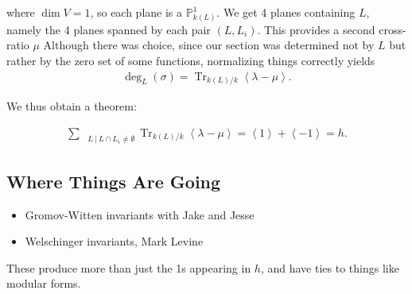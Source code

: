 \begin{example}[?]
where \(\dim V = 1\), so each plane is a \({\mathbb{P}}^1_{k(L)}\). We
get 4 planes containing \(L\), namely the 4 planes spanned by each pair
\((L, L_i)\). This provides a second cross-ratio \(\mu\) Although there
was choice, since our section was determined not by \(L\) but rather by
the zero set of some functions, normalizing things correctly yields
\begin{align*}
\deg_L(\sigma) = \operatorname{Tr}_{k(L) / k}\left\langle{\lambda-\mu}\right\rangle.
\end{align*}

\end{example}

We thus obtain a theorem:

\begin{theorem}[?]

\begin{align*} \sum_{\quad L {~\mathrel{\Big|}~}L \cap L_i \neq\emptyset}\operatorname{Tr}_{k(L) / k}\left\langle{\lambda-\mu}\right\rangle = \left\langle{1}\right\rangle + \left\langle{-1}\right\rangle = h .\end{align*}

\end{theorem}

\hypertarget{where-things-are-going}{%
\subsection{Where Things Are Going}\label{where-things-are-going}}

\begin{itemize}
\tightlist
\item
  Gromov-Witten invariants with Jake and Jesse
\item
  Welschinger invariants, Mark Levine
\end{itemize}

These produce more than just the 1s appearing in \(h\), and have ties to
things like modular forms.


\printbibliography[title=Bibliography]



